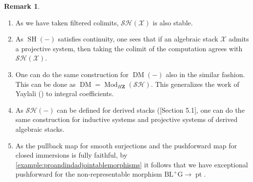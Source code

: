 \documentclass[14pt]{article}
\theoremstyle{definition}
\newtheorem{remark}[theorem]{Remark}
\newcommand{\op}[1]{\operatorname{#1}}
\newcommand{\X}{\mathcal{X}}
\numberwithin{subsection}{section}
\newcommand{\SH}{\mathcal{SH}}
\begin{document}
\begin{remark}
    \begin{enumerate}
    \item As we have taken filtered colimits, $\SH(\X)$ is also stable. 
    \item As $\op{SH}(-)$ satisfies continuity, one sees that if an algebraic stack $\X$ admits a projective system, then taking the colimit of the computation agrees with $\SH(\X)$. 
        \item One can do the same construction for $\op{DM}(-)$ also in the similar fashion. This can be done as $\op{DM}= \op{Mod}_{H\mathbf{Z}}(\SH)$. This generalizes the work of Yaylali (\cite{yaylali2025rationalmotivesproalgebraicstacks}) to integral coefficients. 
        \item  As $\SH(-)$ can be defined for derived stacks (\cite{chowdhury2025nonrepresentablesixfunctorformalisms}[Section 5.1], one can do the same construction for inductive systems and projective systems of derived algebraic stacks.
        \item As the pullback map for smooth surjections and the pushforward map for closed immersions is fully faithful, by \cref{example:proandindadjointablemorphisms} it follows that we have exceptional pushforward for the non-representable morphism $\op{BL^+G} \to \op{pt}$. 
    \end{enumerate}
\end{remark}







		
		
	
\end{document}
